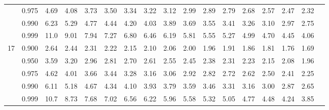 {\begin{center}
\begin{tabular}{rrr@{\,}r@{\,}r@{\,}r@{\,}r@{\,}r@{\,}r@{\,}r
                   @{\,}r@{\,}r@{\,}r@{\,}r@{\,}r@{\,}r@{\,}r}
  &0.975&4.69&4.08&3.73&3.50&3.34&3.22&3.12&2.99&2.89&2.79&2.68&2.57&2.47&2.32\\
  &0.990&6.23&5.29&4.77&4.44&4.20&4.03&3.89&3.69&3.55&3.41&3.26&3.10&2.97&2.75\\
  &0.999&11.0&9.01&7.94&7.27&6.80&6.46&6.19&5.81&5.55&5.27&4.99&4.70&4.45&4.06\\
17&0.900&2.64&2.44&2.31&2.22&2.15&2.10&2.06&2.00&1.96&1.91&1.86&1.81&1.76&1.69\\
  &0.950&3.59&3.20&2.96&2.81&2.70&2.61&2.55&2.45&2.38&2.31&2.23&2.15&2.08&1.96\\
  &0.975&4.62&4.01&3.66&3.44&3.28&3.16&3.06&2.92&2.82&2.72&2.62&2.50&2.41&2.25\\
  &0.990&6.11&5.18&4.67&4.34&4.10&3.93&3.79&3.59&3.46&3.31&3.16&3.00&2.87&2.65\\
  &0.999&10.7&8.73&7.68&7.02&6.56&6.22&5.96&5.58&5.32&5.05&4.77&4.48&4.24&3.85
\end{tabular}
\end{center}

\newpage



}
